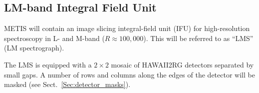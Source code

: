 

\subsection{LM-band Integral Field Unit}
\label{ssec:instrument_data_LMS}

METIS will contain an image slicing integral-field unit (IFU) for
high-resolution spectroscopy in L- and M-band ($R\approx
100,000$). This will be referred to as ``LMS'' (LM spectrograph).

The LMS is equipped with a $2\times2$ mosaic of HAWAII2RG detectors
separated by small gaps. A number of rows and columns along the edges
of the detector will be masked (see Sect.\ \ref{Sec:detector_masks}).

